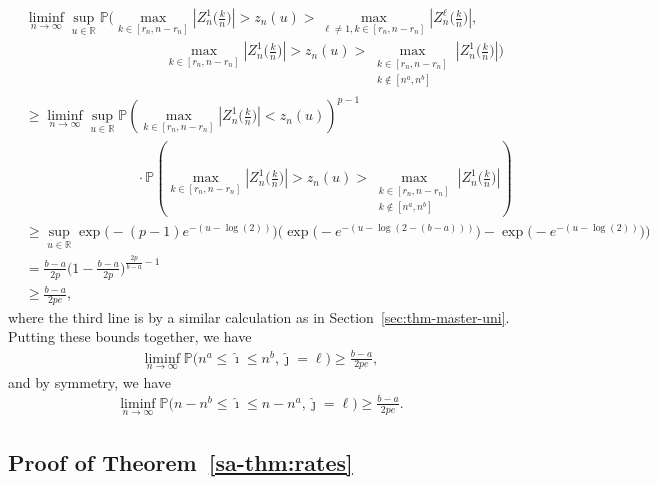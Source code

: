 \documentclass[10pt]{article}
\def\P{\mathbb{P}}
\def\reals{\mathbb{R}}
\theoremstyle{definition}
\theoremstyle{remark}
\begin{document}
\begin{align*}
    & \liminf_{n \rightarrow \infty} \sup_{u \in \reals} \P \Big(\max_{k \in [r_n, n - r_n]} |Z_n^1\Big(\frac{k}{n}\Big)| > z_n(u) > \max_{\ell \neq 1, k \in [r_n, n - r_n]}|Z_n^\ell\Big(\frac{k}{n}\Big)|, \\
    & \qquad\qquad\qquad\qquad\qquad \max_{k \in [r_n, n - r_n]} |Z_n^1\Big(\frac{k}{n}\Big)| > z_n(u) > \max_{\substack{k \in [r_n,n-r_n]\\ k \notin [n^a,n^b]}} |Z_n^1\Big(\frac{k}{n}\Big)| \Big) \\
    & \geq \liminf_{n \rightarrow \infty} \sup_{u \in \reals} \P(\max_{k \in [r_n, n - r_n]}|Z_n^1\Big(\frac{k}{n}\Big)| < z_n(u))^{p-1} \\
    & \qquad\qquad\qquad\qquad \cdot \P(\max_{k \in [r_n, n - r_n]}|Z_n^1\Big(\frac{k}{n}\Big)| > z_n(u) > \max_{\substack{k \in [r_n, n - r_n]\\ k \notin [n^a, n^b]}}|Z_n^1\Big(\frac{k}{n}\Big)| )\\
    & \geq \sup_{u \in \reals} \exp\Big(-(p-1)e^{-(u-\log(2))}\Big)\Big( \exp\Big(-e^{-(u-\log(2-(b-a)))}\Big) - \exp\Big(-e^{-(u-\log(2))}\Big)\Big) \\
    & =  \frac{b-a}{2p}\bigg(1-\frac{b-a}{2p}\bigg)^{\frac{2p}{b-a}-1} \\
    & \geq \frac{b-a}{2pe},
\end{align*}
where the third line is by a similar calculation as in Section~\ref{sec:thm-master-uni}. Putting these bounds together, we have
\begin{align*}
    \liminf_{n\to\infty} \mathbb{P}\big( n^{a} \leq \hat{\imath} \leq n^{b}, \hat{\jmath} = \ell \big) \geq \frac{b - a}{2 p e},
\end{align*}
and by symmetry, we have
\begin{align*}
    \liminf_{n\to\infty} \mathbb{P}\big( n - n^{b} \leq \hat{\imath} \leq n  -n^{a}, \hat{\jmath} = \ell \big) \geq \frac{b - a}{2 p e}.
\end{align*}


\subsection{Proof of Theorem~\ref{sa-thm:rates}}
\end{document}
